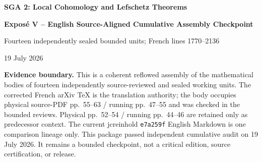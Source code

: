 \documentclass[11pt,a4paper]{article}
\theoremstyle{sgaprop}
\theoremstyle{sgacor}
\begin{document}
\begin{center}
  {\LARGE\bfseries SGA 2: Local Cohomology and Lefschetz Theorems}\par\medskip
  {\Large\bfseries Expos\'e V -- English Source-Aligned Cumulative Assembly Checkpoint}\par\medskip
  {\normalsize Fourteen independently sealed bounded units; French lines 1770--2136}\par
  {\small 19 July 2026}
\end{center}

\vspace{0.5\baselineskip}
\noindent\colorbox{softblue}{\parbox{0.94\linewidth}{\small
\textbf{Evidence boundary.} This is a coherent reflowed assembly of the
mathematical bodies of fourteen independently source-reviewed and sealed
working units. The corrected French arXiv TeX is the translation authority;
the body occupies physical source-PDF pp.~55--63 / running pp.~47--55 and
was checked in the bounded reviews. Physical pp.~52--54 / running pp.~44--46
are retained only as predecessor context. The current
jcreinhold \texttt{e7a259f} English Markdown is one comparison lineage only.
This package passed independent cumulative audit on 19 July 2026. It remains
a bounded checkpoint, not a critical edition, source certification, or release.}}
\end{document}
